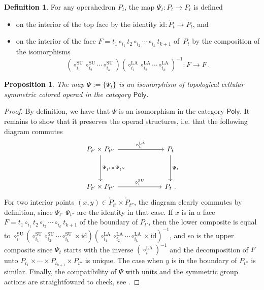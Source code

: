 \documentclass{amsart}
\newtheorem{proposition}[theorem]{Proposition}
\theoremstyle{definition}
\newtheorem{definition}[theorem]{Definition}
\newcommand{\SU}{\mathrm{SU}}
\newcommand{\LA}{\mathrm{LA}}
\newcommand{\PolySub}{\mathsf{Poly}}
\newcommand{\id}{\mathrm{id}}
\begin{document}
\begin{definition}
    For any operahedron $P_t$, the map $\Psi_t : P_t \to P_t$ is defined 
    \begin{itemize}
        \item on the interior of the top face by the identity $\id : \mathring P_t \to \mathring P_t$, and 
        \item on the interior of the face $F=t_1 \circ_{i_1} t_2 \circ_{i_2} \cdots \circ_{i_k} t_{k+1}$ of~$P_t$ by the composition of the isomorphisms
        \[ 
        (\circ_{i_1}^\SU \circ_{i_2}^\SU \cdots \circ_{i_k}^\SU) (\circ_{i_1}^\LA \circ_{i_2}^\LA \cdots \circ_{i_k}^\LA)^{-1}: F \to F \ . \] 
    \end{itemize}
\end{definition}

\begin{proposition}
    \label{thm:top-iso}
    The map $\Psi:=\{\Psi_t\}$ is an isomorphism of topological cellular symmetric colored operad in the category $\PolySub$.
\end{proposition}

\begin{proof}
    By definition, we have that $\Psi$ is an isomorphism in the category $\PolySub$. 
    It remains to show that it preserves the operad structures, i.e. that the following diagram commutes
    \[
    \vcenter{\hbox{
    \begin{tikzcd}[column sep=2.2cm, row sep=1.3cm]
    P_{t'}\times P_{t''}
    \arrow[r,  "\circ_i^\LA"] 
    \arrow[d,  "\Psi_{t'}\times\Psi_{t''}"]
    & P_{t} \arrow[d,  "\Psi_t"] \\
    P_{t'}\times P_{t''}  
    \arrow[r,  "\circ_i^\SU"]
    & P_{t}\ .
    \end{tikzcd}
    }}\]
    For two interior points $(x,y) \in \mathring P_{t'}\times \mathring P_{t''}$, the diagram clearly commutes by definition, since $\Psi_{t'}$ $\Psi_{t''}$ are the identity in that case. 
    If $x$ is in a face $F=t_1 \circ_{i_1} t_2 \circ_{i_2} \cdots \circ_{i_k} t_{k+1}$ of the boundary of $P_{t'}$, then the lower composite is equal to $\circ_i^\SU (\circ_{i_1}^\SU \circ_{i_2}^\SU \cdots \circ_{i_k}^\SU \times \id)(\circ_{i_1}^\LA \circ_{i_2}^\LA \cdots \circ_{i_k}^\LA \times \id)^{-1}$, and so is the upper composite since $\Psi_t$ starts with the inverse $(\circ_i^\LA)^{-1}$ and the decomposition of $F$ unto $P_{t_1} \times \cdots \times P_{t_{k+1}} \times P_{t''}$ is unique.
    The case when $y$ is in the boundary of $P_{t''}$ is similar.  
    Finally, the compatibility of $\Psi$ with units and the symmetric group actions are straightfoward to check, see \cite[Def. 4.17 and Thm 4.18]{LA21}.
\end{proof}
\end{document}
